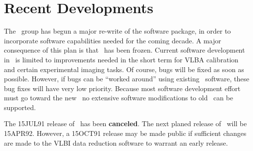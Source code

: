

\newcommand{\AIPRELEASE}{July 15, 1991}
\newcommand{\AIPVOLUME}{Volume XI}
\newcommand{\AIPNUMBER}{Number 3}
\newcommand{\RELEASENAME}{\tt 15JUL91}


\normalstyle
\section{Recent Developments}
The \AIPS\ group has begun a major re-write of the software package,
in order to incorporate software
capabilities needed for the coming decade.
A major consequence of this plan is that \AIPS\ has been frozen.  Current
software development in \AIPS\  is limited to improvements needed in the short
term for VLBA calibration and certain experimental imaging tasks.  Of course,
bugs will be fixed as soon as possible.  However, if bugs can be ``worked
around'' using existing \AIPS\  software, these bug fixes will have very low
priority.  Because most software development effort must go toward the new
\AIPS\, no extensive software modifications to old \AIPS\ can be supported.

The 15JUL91 release of \AIPS\ has been {\bf canceled}.
The next planed release of \AIPS\ will be 15APR92.
However, a 15OCT91 release may be made public if sufficient changes
are made to the VLBI data reduction software to warrant an early release.


